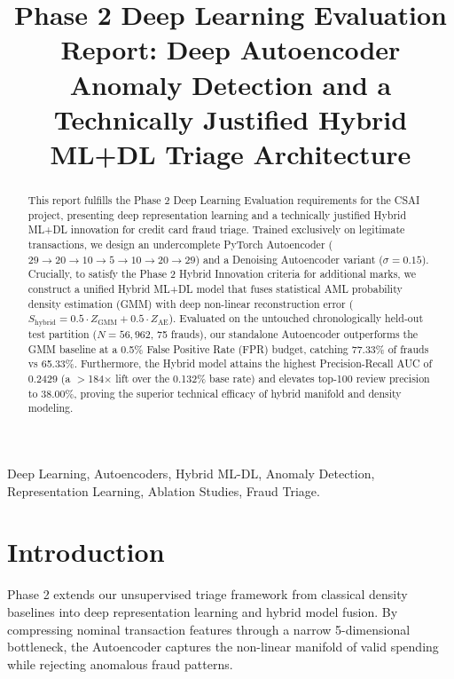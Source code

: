 \documentclass[conference]{IEEEtran}
\begin{document}
\title{Phase 2 Deep Learning Evaluation Report: Deep Autoencoder Anomaly Detection and a Technically Justified Hybrid ML+DL Triage Architecture}

\author{
}

\maketitle

\begin{abstract}
This report fulfills the Phase 2 Deep Learning Evaluation requirements for the CSAI project, presenting deep representation learning and a technically justified Hybrid ML+DL innovation for credit card fraud triage. Trained exclusively on legitimate transactions, we design an undercomplete PyTorch Autoencoder ($29 \to 20 \to 10 \to 5 \to 10 \to 20 \to 29$) and a Denoising Autoencoder variant ($\sigma = 0.15$). Crucially, to satisfy the Phase 2 Hybrid Innovation criteria for additional marks, we construct a unified Hybrid ML+DL model that fuses statistical AML probability density estimation (GMM) with deep non-linear reconstruction error ($S_{\text{hybrid}} = 0.5 \cdot Z_{\text{GMM}} + 0.5 \cdot Z_{\text{AE}}$). Evaluated on the untouched chronologically held-out test partition ($N = 56,962$, 75 frauds), our standalone Autoencoder outperforms the GMM baseline at a 0.5\% False Positive Rate (FPR) budget, catching 77.33\% of frauds vs 65.33\%. Furthermore, the Hybrid model attains the highest Precision-Recall AUC of 0.2429 (a $>$184$\times$ lift over the 0.132\% base rate) and elevates top-100 review precision to 38.00\%, proving the superior technical efficacy of hybrid manifold and density modeling.
\end{abstract}

\begin{IEEEkeywords}
Deep Learning, Autoencoders, Hybrid ML-DL, Anomaly Detection, Representation Learning, Ablation Studies, Fraud Triage.
\end{IEEEkeywords}

\section{Introduction}
Phase 2 extends our unsupervised triage framework from classical density baselines into deep representation learning and hybrid model fusion. By compressing nominal transaction features through a narrow 5-dimensional bottleneck, the Autoencoder captures the non-linear manifold of valid spending while rejecting anomalous fraud patterns.
\end{document}
